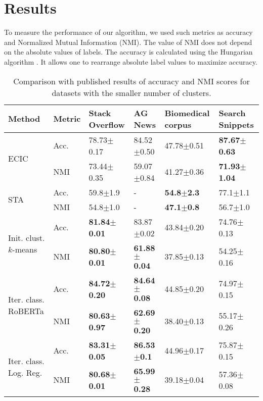 \documentclass[11pt,a4paper]{article}
\begin{document}
\section{Results}
To measure the performance of our algorithm, we used such metrics as accuracy and Normalized Mutual Information (NMI). The value of NMI does not depend on the absolute values of labels. The accuracy is calculated using the Hungarian algorithm \cite{xu2017self}. It allows one to rearrange absolute label values to maximize accuracy.
\begin{table*}
\centering 
\begin{tabular}{llllll}
\hline
\textbf{Method} &  \textbf{Metric} & \textbf{Stack Overflow} & \textbf{AG News} & \textbf{Biomedical corpus} & \textbf{Search Snippets} \\
\hline
\multirow{2}{4em}{ECIC} & Acc. & 78.73$\pm$0.17 & 84.52$\pm$0.50 & 47.78$\pm$0.51 & \textbf{87.67$\pm$0.63} \\
& NMI &  73.44$\pm$0.35 & 59.07$\pm$0.84 & 41.27$\pm$0.36 & \textbf{71.93$\pm$1.04} \\
\hline
\multirow{2}{4em}{STA} & Acc. & 59.8$\pm$1.9 & - & \textbf{54.8$\pm$2.3} & 77.1$\pm$1.1 \\
& NMI & 54.8$\pm$1.0 & - & \textbf{47.1$\pm$0.8} & 56.7$\pm$1.0 \\
\hline
\multirow{2}{4em}{Init. clust.  $k$-means} & Acc. & \textbf{81.84$\pm$0.01} &  83.87$\pm$0.02 & 43.84$\pm$0.20 & 74.76$\pm$0.13 \\
& NMI & \textbf{80.80$\pm$0.01} & \textbf{61.88$\pm$0.04} & 37.85$\pm$0.13 & 54.25$\pm$0.16 \\
\hline
\multirow{2}{4em}{Iter. class. RoBERTa} & Acc. & \textbf{84.72$\pm$0.20} & \textbf{84.64$\pm$0.08} & 44.85$\pm$0.20 & 74.97$\pm$0.15 \\
& NMI & \textbf{80.63$\pm$0.97} & \textbf{62.69$\pm$0.20} & 38.40$\pm$0.13 & 55.17$\pm$0.26 \\
\hline
\multirow{2}{4em}{Iter. class. Log. Reg.} & Acc. & \textbf{83.31$\pm$0.05} & \textbf{86.53$\pm$0.1} & 44.96$\pm$0.17 & 75.87$\pm$0.15 \\
& NMI & \textbf{80.68$\pm$0.01} & \textbf{65.99$\pm$0.28} & 39.18$\pm$0.04 & 57.36$\pm$0.08 \\
\hline
\end{tabular}
\caption{Comparison with published results of accuracy and NMI scores for datasets with the smaller number of clusters.} 
\label{sota1}
\end{table*}
\end{document}
